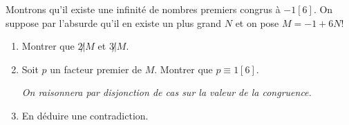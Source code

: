 
Montrons qu'il existe une infinité de nombres premiers congrus à $-1[6]$. On suppose par l'absurde qu'il en existe un plus grand $N$ et on pose $M = -1 + 6 N!$

\begin{enumerate}

\item Montrer que $2 \not | M$ et $3 \not | M$.

\item Soit $p$ un facteur premier de $M$. Montrer que $p \equiv 1[6]$.

 \emph{On raisonnera par disjonction de cas sur la valeur de la congruence.}


\item En déduire une contradiction.

\end{enumerate}



